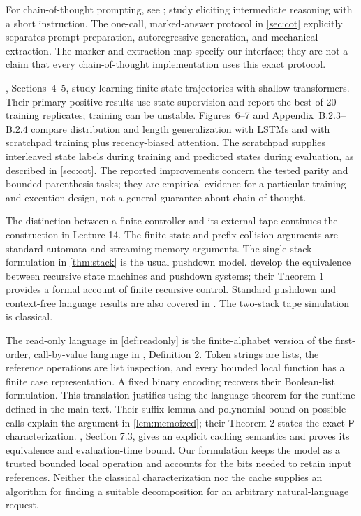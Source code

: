 \documentclass[11pt,twoside]{article}
\theoremstyle{definition}
\theoremstyle{remark}
\begin{document}
For chain-of-thought prompting, see \citet{wei2022}; \citet{kojima2022}
study eliciting intermediate reasoning with a short instruction. The
one-call, marked-answer protocol in \cref{sec:cot} explicitly separates
prompt preparation, autoregressive generation, and mechanical extraction.
The marker and extraction map specify our interface; they are not a claim
that every chain-of-thought implementation uses this exact protocol.

\citet{liu2023automata}, Sections~4--5, study learning finite-state
trajectories with shallow transformers. Their primary positive results use
state supervision and report the best of 20 training replicates; training
can be unstable. Figures~6--7 and Appendix~B.2.3--B.2.4 compare distribution
and length generalization with LSTMs and with scratchpad training plus
recency-biased attention. The scratchpad supplies interleaved state labels
during training and predicted states during evaluation, as described in
\cref{sec:cot}. The reported improvements concern the tested parity and
bounded-parenthesis tasks; they are empirical evidence for a particular
training and execution design, not a general guarantee about chain of thought.

The distinction between a finite controller and its external tape continues
the construction in Lecture 14. The finite-state and prefix-collision
arguments are standard automata and streaming-memory arguments. The
single-stack formulation in \cref{thm:stack} is the usual pushdown model.
\citet{alur2005} develop the equivalence between recursive state machines
and pushdown systems; their Theorem 1 provides a formal account of finite
recursive control. Standard pushdown and context-free language results are
also covered in \citet{aho2015}. The two-stack tape simulation is classical.

The read-only language in \cref{def:readonly} is the finite-alphabet version
of the first-order, call-by-value language in \citet{jones2020}, Definition 2.
Token strings are lists, the reference operations are list inspection, and
every bounded local function has a finite case representation. A fixed
binary encoding recovers their Boolean-list formulation. This translation
justifies using the language theorem for the runtime defined in the main text.
Their suffix lemma and polynomial bound on possible calls explain the
argument in \cref{lem:memoized}; their Theorem 2 states the exact
$\mathsf P$ characterization. , Section 7.3, gives an
explicit caching semantics and proves its equivalence and evaluation-time
bound. Our formulation keeps the model as a trusted bounded local operation
and accounts for the bits needed to retain input references. Neither the
classical characterization nor the cache supplies an algorithm for finding
a suitable decomposition for an arbitrary natural-language request.
\end{document}
